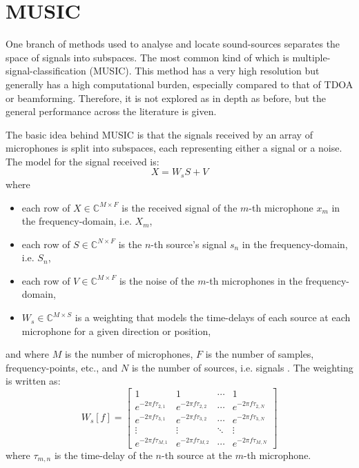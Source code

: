 \documentclass[notitlepage]{report}
\begin{document}
\section{MUSIC}

One branch of methods used to analyse and locate sound-sources separates the space of signals into subspaces. The most common kind of which is multiple-signal-classification (MUSIC). This method has a very high resolution but generally has a high computational burden, especially compared to that of TDOA or beamforming. Therefore, it is not explored as in depth as before, but the general performance across the literature is given.

The basic idea behind MUSIC is that the signals received by an array of microphones is split into subspaces, each representing either a signal or a noise. The model for the signal received is:
\begin{equation}
X = W_s S + V
\end{equation}
where 
\begin{itemize}
	\item each row of $X\in \mathbb{C}^{M\times F}$ is the received signal of the $m$-th microphone $x_m$ in the frequency-domain, i.e. $X_m$,
	\item each row of $S\in \mathbb{C}^{N\times F}$ is the $n$-th source's signal $s_n$ in the frequency-domain, i.e. $S_n$,
	\item each row of $V\in \mathbb{C}^{M\times F}$ is the noise of the $m$-th microphones in the frequency-domain,
	\item $W_s\in \mathbb{C}^{M\times S}$ is a weighting that models the time-delays of each source at each microphone for a given direction or position,
\end{itemize}
and where $M$ is the number of microphones, $F$ is the number of samples, frequency-points, etc., and $N$ is the number of sources, i.e. signals \cite{rascon_localization_2017}. The weighting is written as:
\begin{equation}
W_s[f] = 
\begin{bmatrix}
	1 						& 1						& \cdots		& 1						\\
	e^{-2\pi f\tau_{2,1}}	& e^{-2\pi f\tau_{2,2}}	& \cdots		& e^{-2\pi f\tau_{2,N}}	\\
	e^{-2\pi f\tau_{3,1}}	& e^{-2\pi f\tau_{3,2}}	& \cdots		& e^{-2\pi f\tau_{3,N}}	\\
	\vdots					& \vdots					& \ddots		& \vdots					\\
	e^{-2\pi f\tau_{M,1}}	& e^{-2\pi f\tau_{M,2}}	& \cdots		& e^{-2\pi f\tau_{M,N}}
\end{bmatrix}
\end{equation}
where $\tau_{m,n}$ is the time-delay of the $n$-th source at the $m$-th microphone.
\end{document}
